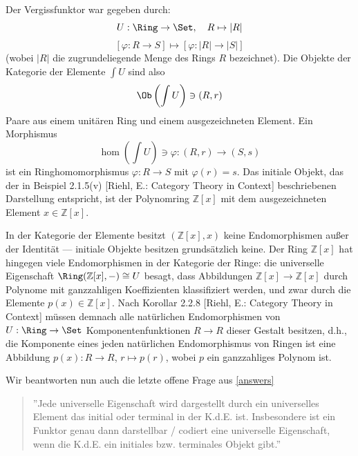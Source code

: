 \documentclass[11pt]{article}
\newcommand{\book}{[Riehl, E.: Category Theory in Context] }
\begin{document}
\begin{example}
Der Vergissfunktor war gegeben durch:
$$U : \Ring \to \Set, \quad R \mapsto |R|$$
$$[\varphi : R \to S] \mapsto [\varphi : |R| \to |S|]$$
(wobei $|R|$ die zugrundeliegende Menge des Rings $R$ bezeichnet).
Die Objekte der Kategorie der Elemente $\int U$ sind also
$$\Ob\left(\int U\right) \ni (R, r)$$
Paare aus einem unitären Ring und einem ausgezeichneten Element. 
Ein Morphismus
$$\hom\left(\int U\right) \ni \varphi \colon (R, r) \to (S, s)$$
ist ein Ringhomomorphismus $\varphi : R \to S$ mit $\varphi(r) = s$. Das 
initiale Objekt, das der in Beispiel 2.1.5(v) \book beschriebenen 
Darstellung entspricht, ist der Polynomring $\mathbb{Z}[x]$ mit dem 
ausgezeichneten Element $x \in \mathbb{Z}[x]$.

In der Kategorie der Elemente besitzt $(\mathbb{Z}[x], x)$ keine 
Endomorphismen außer der Identität --- initiale Objekte besitzen 
grundsätzlich keine. Der Ring $\mathbb{Z}[x]$ hat hingegen viele 
Endomorphismen in der Kategorie der Ringe: die universelle Eigenschaft 
$\Ring(\mathbb{Z}[x], -) \cong U$ besagt, dass Abbildungen 
$\mathbb{Z}[x] \to \mathbb{Z}[x]$ durch Polynome mit ganzzahligen 
Koeffizienten klassifiziert werden, und zwar durch die Elemente 
$p(x) \in \mathbb{Z}[x]$. Nach Korollar 2.2.8 \book müssen demnach alle 
natürlichen Endomorphismen von $U : \Ring \to \Set$ Komponentenfunktionen 
$R \to R$ dieser Gestalt besitzen, d.h., die Komponente eines jeden 
natürlichen Endomorphismus von Ringen ist eine Abbildung 
$p(x) : R \to R$, $r \mapsto p(r)$, wobei $p$ ein ganzzahliges 
Polynom ist.
\end{example}
\begin{note}
Wir beantworten nun auch die letzte offene Frage aus \ref{answers}
\begin{quote} ''Jede universelle Eigenschaft wird dargestellt durch ein universelles Element das initial oder terminal in der K.d.E. ist. Insbesondere ist ein Funktor genau dann darstellbar / codiert eine universelle Eigenschaft, wenn die K.d.E. ein initiales bzw. terminales Objekt gibt.''
\end{quote}
\end{note}
\end{document}
